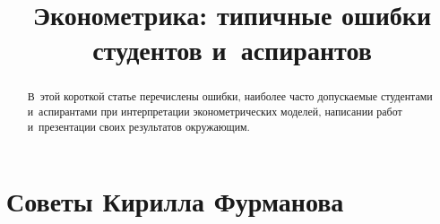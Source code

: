 \documentclass[final,pdftex]{../../template/epsilonj}
\begin{document}
\setcounter{page}{23}

\begin{frontmatter}
\title{Эконометрика: типичные ошибки студентов и~аспирантов}

\begin{aug}
\author{ }%
\author{ }


\address{НИУ ВШЭ, Москва.}
\end{aug}

\begin{abstract}
В~этой короткой статье перечислены ошибки, наиболее часто допускаемые студентами и~аспирантами при интерпретации эконометрических моделей, написании работ и~презентации своих результатов окружающим.
\end{abstract}

\begin{keyword}
\end{keyword}

\end{frontmatter}


\section{Советы Кирилла Фурманова}
\end{document}
